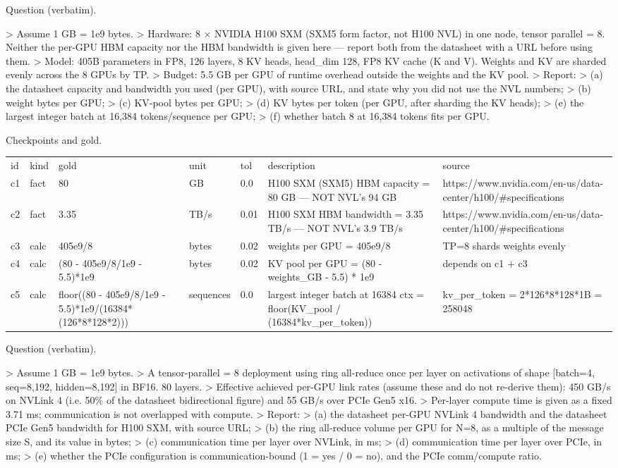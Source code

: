 \documentclass[10pt,twocolumn]{article}
\begin{document}
Question (verbatim).


> Assume 1 GB = 1e9 bytes. > Hardware: 8 × NVIDIA H100 SXM (SXM5 form factor, not H100 NVL) in one node, tensor parallel = 8. Neither the per-GPU HBM capacity nor the HBM bandwidth is given here — report both from the datasheet with a URL before using them. > Model: 405B parameters in FP8, 126 layers, 8 KV heads, head\_dim 128, FP8 KV cache (K and V). Weights and KV are sharded evenly across the 8 GPUs by TP. > Budget: 5.5 GB per GPU of runtime overhead outside the weights and the KV pool. > Report: > (a) the datasheet capacity and bandwidth you used (per GPU), with source URL, and state why you did not use the NVL numbers; > (b) weight bytes per GPU; > (c) KV-pool bytes per GPU; > (d) KV bytes per token (per GPU, after sharding the KV heads); > (e) the largest integer batch at 16,384 tokens/sequence per GPU; > (f) whether batch 8 at 16,384 tokens fits per GPU.


Checkpoints and gold.


\begin{table}[h]
\centering
\begin{tabular}{lllllll}
id & kind & gold & unit & tol & description & source \\
c1 & fact & 80 & GB & 0.0 & H100 SXM (SXM5) HBM capacity = 80 GB — NOT NVL's 94 GB & https://www.nvidia.com/en-us/data-center/h100/\#specifications \\
c2 & fact & 3.35 & TB/s & 0.01 & H100 SXM HBM bandwidth = 3.35 TB/s — NOT NVL's 3.9 TB/s & https://www.nvidia.com/en-us/data-center/h100/\#specifications \\
c3 & calc & 405e9/8 & bytes & 0.02 & weights per GPU = 405e9/8 & TP=8 shards weights evenly \\
c4 & calc & (80 - 405e9/8/1e9 - 5.5)*1e9 & bytes & 0.02 & KV pool per GPU = (80 - weights\_GB - 5.5) * 1e9 & depends on c1 + c3 \\
c5 & calc & floor((80 - 405e9/8/1e9 - 5.5)*1e9/(16384*(126*8*128*2))) & sequences & 0.0 & largest integer batch at 16384 ctx = floor(KV\_pool / (16384*kv\_per\_token)) & kv\_per\_token = 2*126*8*128*1B = 258048
\end{tabular}
\end{table}


Question (verbatim).


> Assume 1 GB = 1e9 bytes. > A tensor-parallel = 8 deployment using ring all-reduce once per layer on activations of shape [batch=4, seq=8,192, hidden=8,192] in BF16. 80 layers. > Effective achieved per-GPU link rates (assume these and do not re-derive them): 450 GB/s on NVLink 4 (i.e. 50\% of the datasheet bidirectional figure) and 55 GB/s over PCIe Gen5 x16. > Per-layer compute time is given as a fixed 3.71 ms; communication is not overlapped with compute. > Report: > (a) the datasheet per-GPU NVLink 4 bandwidth and the datasheet PCIe Gen5 bandwidth for H100 SXM, with source URL; > (b) the ring all-reduce volume per GPU for N=8, as a multiple of the message size S, and its value in bytes; > (c) communication time per layer over NVLink, in ms; > (d) communication time per layer over PCIe, in ms; > (e) whether the PCIe configuration is communication-bound (1 = yes / 0 = no), and the PCIe comm/compute ratio.
\end{document}
